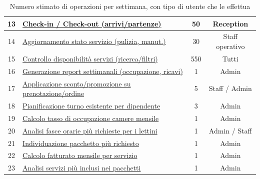 \documentclass[a4paper,12pt]{report}
\begin{document}
\begin{table}[H]
\begin{tabularx}{\textwidth}{|c|>{\raggedright\arraybackslash}X|c|c|}
		\hline
		13          & \hyperref[op13]{Check-in / Check-out (arrivi/partenze)}                & 50                & Reception              \\
		\hline
		14          & \hyperref[op14]{Aggiornamento stato servizio (pulizia, manut.)}        & 30                & Staff operativo        \\
		\hline
		15          & \hyperref[op15]{Controllo disponibilità servizi (ricerca/filtri)}      & 550               & Tutti                  \\
		\hline
		16          & \hyperref[op16]{Generazione report settimanali (occupazione, ricavi)}  & 1                 & Admin                  \\
		\hline
		17          & \hyperref[op17]{Applicazione sconto/promozione su prenotazione/ordine} & 5                 & Staff / Admin          \\
		\hline
		18          & \hyperref[op18]{Pianificazione turno esistente per dipendente}  & 3                 & Admin                  \\
		\hline
		19          & \hyperref[op19]{Calcolo tasso di occupazione camere mensile}           & 1                 & Admin                  \\
		\hline
		20          & \hyperref[op20]{Analisi fasce orarie più richieste per i lettini}      & 1                 & Admin / Staff          \\
		\hline
		21          & \hyperref[op21]{Individuazione pacchetto più richiesto}                & 1                 & Admin                  \\
		\hline
		22          & \hyperref[op22]{Calcolo fatturato mensile per servizio}                & 1                 & Admin                  \\
		\hline
		23          & \hyperref[op23]{Analisi servizi più inclusi nei pacchetti}             & 1                 & Admin                  \\
		\hline
	\end{tabularx}
	\caption{Numero stimato di operazioni per settimana, con tipo di utente che le effettua}
	\label{tab:operazioni-settimanali}
\end{table}

\newpage
\end{document}
